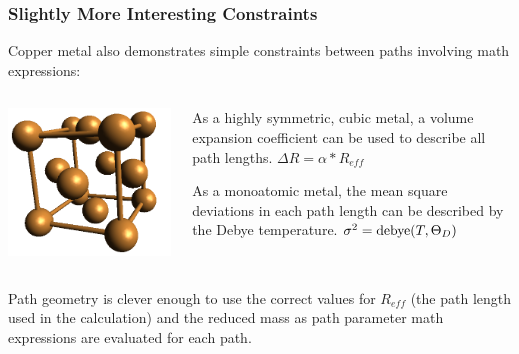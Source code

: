 \documentclass[10pt, xcolor=x11names, compress]{beamer}
\begin{document}
\begin{frame}
  \frametitle{Slightly More Interesting Constraints}

  Copper metal also demonstrates simple constraints between paths
  involving math expressions:
  \begin{columns}
    \begin{column}{0.4\linewidth}
      \includegraphics[width=\linewidth]{constraints/cu.png}      
    \end{column}
    \begin{column}{0.6\linewidth}
      \begin{description}[xyz]
      \item[$\Delta R$] As a highly symmetric, cubic metal, a volume
        expansion coefficient can be used to describe all path
        lengths. {\color{Green4}$\Delta R = \alpha*R_{eff}$}
      \item[$\sigma^2$] As a monoatomic metal, the mean square
        deviations in each path length can be described by the Debye
        temperature. {\color{Green4}$\sigma^2 = \operatorname{debye}(T, \Theta_D)$}
      \end{description}
    \end{column}
  \end{columns}
  
  \begin{block}{Path geometry}
    {\ifeffit} is clever enough to use the correct values for
    $R_{eff}$ (the path length used in the {\feff} calculation) and
    the reduced mass as path parameter math expressions are evaluated
    for each path.
  \end{block}
\end{frame}
\end{document}
